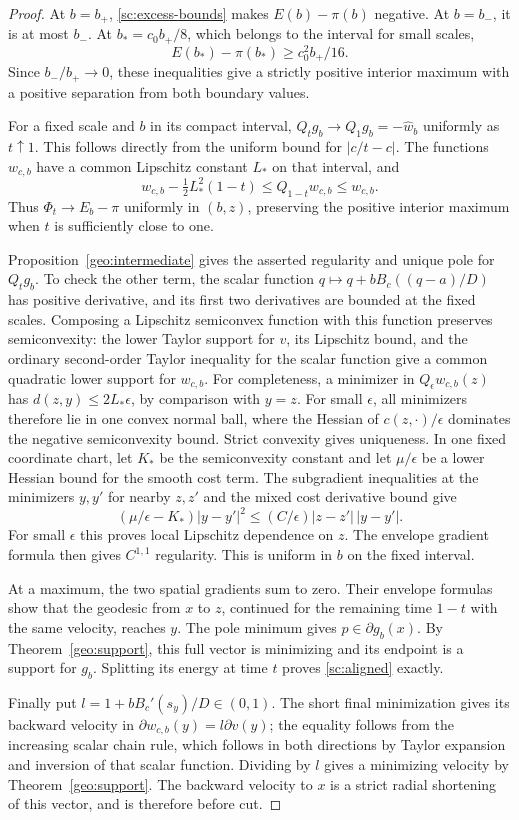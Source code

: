 \begin{proof}
At $b=b_+$, \eqref{sc:excess-bounds} makes $E(b)-\pi(b)$ negative.
At $b=b_-$, it is at most $b_-$.  At
$b_*=c_0b_+/8$, which belongs to the interval for small scales,
\[
 E(b_*)-\pi(b_*)\geq c_0^2b_+/16.
\]
Since $b_-/b_+\to0$, these inequalities give a strictly positive
interior maximum with a positive separation from both boundary values.

For a fixed scale and $b$ in its compact interval,
$Q_tg_b\to Q_1g_b=-\widehat w_b$ uniformly as $t\uparrow1$.
This follows directly from the uniform bound for
$|c/t-c|$.  The functions $w_{c,b}$ have a common Lipschitz constant
$L_*$ on that interval, and
\[
 w_{c,b}-\tfrac12L_*^2(1-t)\leq Q_{1-t}w_{c,b}\leq w_{c,b}.
\]
Thus $\Phi_t\to E_b-\pi$ uniformly in $(b,z)$, preserving the
positive interior maximum when $t$ is sufficiently close to one.

Proposition~\ref{geo:intermediate} gives the asserted regularity and unique
pole for $Q_tg_b$.  To check the other term, the scalar function
$q\mapsto q+bB_c((q-a)/D)$ has positive derivative, and its first two
derivatives are bounded at the fixed scales.  Composing a Lipschitz
semiconvex function with this function preserves semiconvexity: the
lower Taylor support for $v$, its Lipschitz bound, and the ordinary
second-order Taylor inequality for the scalar function give a common
quadratic lower support for $w_{c,b}$.
For completeness, a minimizer in $Q_\epsilon w_{c,b}(z)$ has
$d(z,y)\leq2L_*\epsilon$, by comparison with $y=z$.
For small $\epsilon$, all minimizers therefore lie in one convex
normal ball, where the Hessian of $c(z,\cdot)/\epsilon$ dominates
the negative semiconvexity bound.  Strict convexity gives uniqueness.
In one fixed coordinate chart, let $K_*$ be the semiconvexity constant
and let $\mu/\epsilon$ be a lower Hessian bound for the smooth cost
term.  The subgradient inequalities at the minimizers $y,y'$ for
nearby $z,z'$ and the mixed cost derivative bound give
\[
  (\mu/\epsilon-K_*)|y-y'|^2
       \leq (C/\epsilon)|z-z'|\,|y-y'|.
\]
For small $\epsilon$ this proves local Lipschitz dependence on $z$.
The envelope gradient formula then gives $C^{1,1}$ regularity.
This is uniform in $b$ on the fixed interval.

At a maximum, the two spatial gradients sum to zero.  Their envelope
formulas show that the geodesic from $x$ to $z$, continued for the
remaining time $1-t$ with the same velocity, reaches $y$.
The pole minimum gives $p\in\partial g_b(x)$.
By Theorem~\ref{geo:support}, this full vector is minimizing and its
endpoint is a support for $g_b$.  Splitting its energy at time $t$
proves \eqref{sc:aligned} exactly.

Finally put $l=1+bB_c'(s_y)/D\in(0,1)$.
The short final minimization gives its backward velocity in
$\partial w_{c,b}(y)=l\partial v(y)$; the equality follows from the
increasing scalar chain rule, which follows in both directions by
Taylor expansion and inversion of that scalar function.
Dividing by $l$ gives a minimizing velocity by
Theorem~\ref{geo:support}.  The backward velocity to $x$ is a strict
radial shortening of this vector, and is therefore before cut.
\end{proof}

